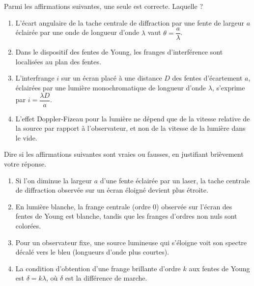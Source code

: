 \documentclass[11pt]{article}
\begin{document}
\begin{exercice}
Parmi les affirmations suivantes, une seule est correcte. Laquelle ?
\begin{enumerate}
    \item L'écart angulaire de la tache centrale de diffraction par une fente de largeur $a$ éclairée par une onde de longueur d'onde $\lambda$ vaut $\theta = \dfrac{a}{\lambda}$.
    \item Dans le dispositif des fentes de Young, les franges d'interférence sont localisées au plan des fentes.
    \item L'interfrange $i$ sur un écran placé à une distance $D$ des fentes d'écartement $a$, éclairées par une lumière monochromatique de longueur d'onde $\lambda$, s'exprime par $i = \dfrac{\lambda D}{a}$.
    \item L'effet Doppler-Fizeau pour la lumière ne dépend que de la vitesse relative de la source par rapport à l'observateur, et non de la vitesse de la lumière dans le vide.
\end{enumerate}
\end{exercice}

\begin{exercice}
Dire si les affirmations suivantes sont vraies ou fausses, en justifiant brièvement votre réponse.
\begin{enumerate}
    \item Si l'on diminue la largeur $a$ d'une fente éclairée par un laser, la tache centrale de diffraction observée sur un écran éloigné devient plus étroite.
    \item En lumière blanche, la frange centrale (ordre 0) observée sur l'écran des fentes de Young est blanche, tandis que les franges d'ordres non nuls sont colorées.
    \item Pour un observateur fixe, une source lumineuse qui s'éloigne voit son spectre décalé vers le bleu (longueurs d'onde plus courtes).
    \item La condition d'obtention d'une frange brillante d'ordre $k$ aux fentes de Young est $\delta = k \lambda$, où $\delta$ est la différence de marche.
\end{enumerate}
\end{exercice}
\end{document}
